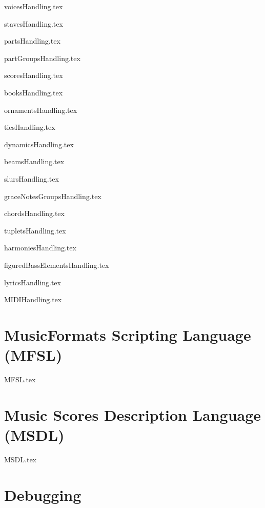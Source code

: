 \documentclass[11pt,a4paper]{report}
\begin{document}
{voicesHandling.tex}

{stavesHandling.tex}

{partsHandling.tex}

{partGroupsHandling.tex}

{scoresHandling.tex}

{booksHandling.tex}

{ornamentsHandling.tex}

{tiesHandling.tex}

{dynamicsHandling.tex}

{beamsHandling.tex}

{slursHandling.tex}

{graceNotesGroupsHandling.tex}

{chordsHandling.tex}

{tupletsHandling.tex}

{harmoniesHandling.tex}

{figuredBassElementsHandling.tex}

{lyricsHandling.tex}

{MIDIHandling.tex}


\part{MusicFormats Scripting Language (MFSL)}

{MFSL.tex}


\part{Music Scores Description Language (MSDL)}

{MSDL.tex}


\part{Debugging}
\end{document}

